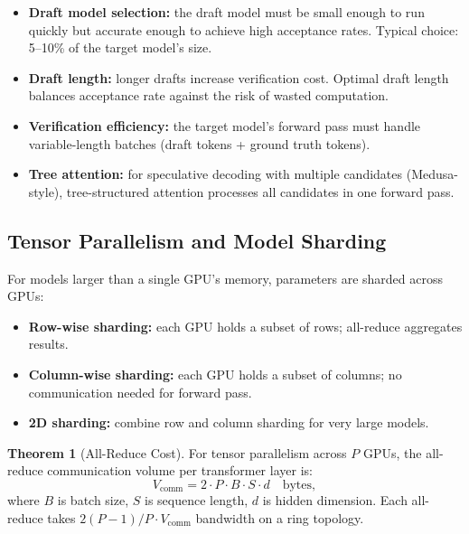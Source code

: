 \documentclass[11pt,a4paper]{article}
\theoremstyle{definition}
\newtheorem{theorem}{Theorem}[section]
\begin{document}
\begin{itemize}
	\item \textbf{Draft model selection:} the draft model must be small enough to run quickly but accurate enough to achieve high acceptance rates. Typical choice: 5--10\% of the target model's size.
	\item \textbf{Draft length:} longer drafts increase verification cost. Optimal draft length balances acceptance rate against the risk of wasted computation.
	\item \textbf{Verification efficiency:} the target model's forward pass must handle variable-length batches (draft tokens + ground truth tokens).
	\item \textbf{Tree attention:} for speculative decoding with multiple candidates (Medusa-style), tree-structured attention processes all candidates in one forward pass.
\end{itemize}

\subsection{Tensor Parallelism and Model Sharding}

For models larger than a single GPU's memory, parameters are sharded across GPUs:

\begin{itemize}
	\item \textbf{Row-wise sharding:} each GPU holds a subset of rows; all-reduce aggregates results.
	\item \textbf{Column-wise sharding:} each GPU holds a subset of columns; no communication needed for forward pass.
	\item \textbf{2D sharding:} combine row and column sharding for very large models.
\end{itemize}

\begin{theorem}[All-Reduce Cost]
	For tensor parallelism across $P$ GPUs, the all-reduce communication volume per transformer layer is:
	\begin{equation}
		V_{\text{comm}} = 2 \cdot P \cdot B \cdot S \cdot d \quad \text{bytes},
	\end{equation}
	where $B$ is batch size, $S$ is sequence length, $d$ is hidden dimension. Each all-reduce takes $2(P-1)/P \cdot V_{\text{comm}}$ bandwidth on a ring topology.
\end{theorem}

\end{document}
